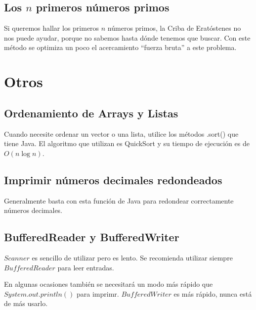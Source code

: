\documentclass{article}
\begin{document}
\begin{multicols}{2}
	\subsection{Los \(n\) primeros números primos}
	Si queremos hallar los primeros \( n \) números primos, la Criba de Eratóstenes	no nos puede ayudar, porque no sabemos hasta dónde tenemos que buscar. Con este método se optimiza un poco el acercamiento ``fuerza bruta'' a este problema.	
		
		
\section{Otros}
	\subsection{Ordenamiento de Arrays y Listas}
	Cuando necesite ordenar un vector o una lista, utilice los métodos .sort() que tiene 		Java. El algoritmo que utilizan es QuickSort y su tiempo de ejecución es de \( O(n\log n) \).	
	
	
	\subsection{Imprimir números decimales redondeados}
	Generalmente basta con esta función de Java para redondear correctamente números decimales.	
	
	
	\subsection{BufferedReader y BufferedWriter}
	\(Scanner\) es sencillo de utilizar pero es lento. Se recomienda utilizar siempre \(BufferedReader\) para leer entradas.
	
	En algunas ocasiones también se necesitará un modo más rápido que \(System.out.println()\) para imprimr. \(BufferedWriter\) es más rápido, nunca está de más usarlo.
	
\end{multicols}	
\end{document}
